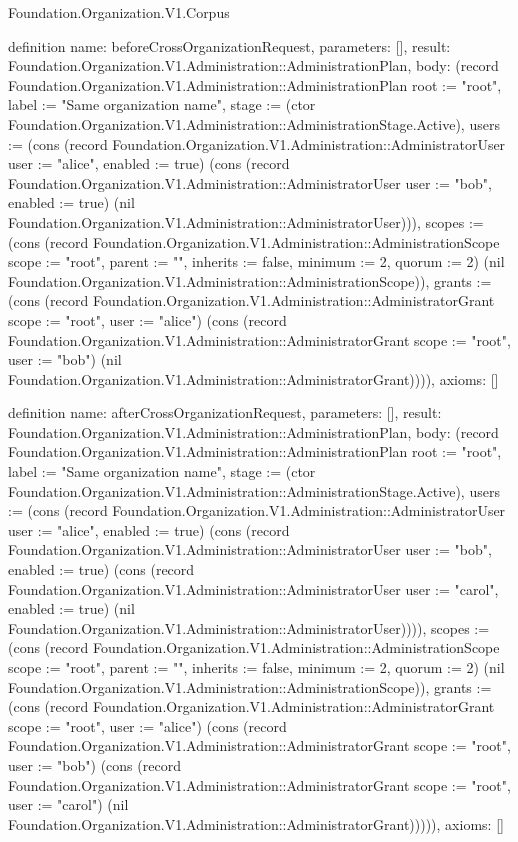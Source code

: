\begin{lexlean}{Foundation.Organization.V1.Corpus}
\begin{semanticmodule}
definition{
  name: beforeCrossOrganizationRequest,
  parameters: [],
  result: Foundation.Organization.V1.Administration::AdministrationPlan,
  body: (record Foundation.Organization.V1.Administration::AdministrationPlan {root := "root", label := "Same organization name", stage := (ctor Foundation.Organization.V1.Administration::AdministrationStage.Active), users := (cons (record Foundation.Organization.V1.Administration::AdministratorUser {user := "alice", enabled := true}) (cons (record Foundation.Organization.V1.Administration::AdministratorUser {user := "bob", enabled := true}) (nil Foundation.Organization.V1.Administration::AdministratorUser))), scopes := (cons (record Foundation.Organization.V1.Administration::AdministrationScope {scope := "root", parent := "", inherits := false, minimum := 2, quorum := 2}) (nil Foundation.Organization.V1.Administration::AdministrationScope)), grants := (cons (record Foundation.Organization.V1.Administration::AdministratorGrant {scope := "root", user := "alice"}) (cons (record Foundation.Organization.V1.Administration::AdministratorGrant {scope := "root", user := "bob"}) (nil Foundation.Organization.V1.Administration::AdministratorGrant)))}),
  axioms: []
}

definition{
  name: afterCrossOrganizationRequest,
  parameters: [],
  result: Foundation.Organization.V1.Administration::AdministrationPlan,
  body: (record Foundation.Organization.V1.Administration::AdministrationPlan {root := "root", label := "Same organization name", stage := (ctor Foundation.Organization.V1.Administration::AdministrationStage.Active), users := (cons (record Foundation.Organization.V1.Administration::AdministratorUser {user := "alice", enabled := true}) (cons (record Foundation.Organization.V1.Administration::AdministratorUser {user := "bob", enabled := true}) (cons (record Foundation.Organization.V1.Administration::AdministratorUser {user := "carol", enabled := true}) (nil Foundation.Organization.V1.Administration::AdministratorUser)))), scopes := (cons (record Foundation.Organization.V1.Administration::AdministrationScope {scope := "root", parent := "", inherits := false, minimum := 2, quorum := 2}) (nil Foundation.Organization.V1.Administration::AdministrationScope)), grants := (cons (record Foundation.Organization.V1.Administration::AdministratorGrant {scope := "root", user := "alice"}) (cons (record Foundation.Organization.V1.Administration::AdministratorGrant {scope := "root", user := "bob"}) (cons (record Foundation.Organization.V1.Administration::AdministratorGrant {scope := "root", user := "carol"}) (nil Foundation.Organization.V1.Administration::AdministratorGrant))))}),
  axioms: []
}


\end{semanticmodule}
\end{lexlean}
